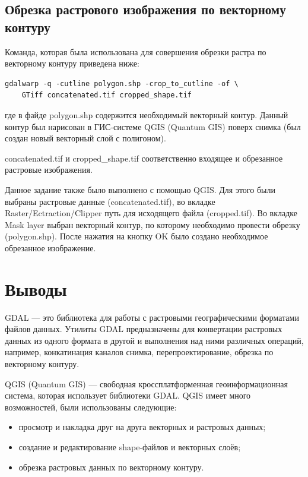 \section{Обрезка растрового изображения по векторному контуру}

Команда, которая была использована для совершения обрезки растра по векторному контуру приведена ниже:

\lstset{language=bash}
\begin{lstlisting}
gdalwarp -q -cutline polygon.shp -crop_to_cutline -of \
	GTiff concatenated.tif cropped_shape.tif
\end{lstlisting}

где в файде polygon.shp содержится необходимый векторный контур. Данный контур был нарисован в ГИС-системе QGIS (Quantum GIS) поверх снимка (был создан новый векторный слой с полигоном). 

concatenated.tif и cropped\_shape.tif соответственно входящее и обрезанное растровые изображения.

Данное задание также было выполнено с помощью QGIS. Для этого были выбраны растровые данные (concatenated.tif), во вкладке Raster/Ectraction/Clipper путь для исходящего файла (cropped.tif). Во вкладке Mask layer выбран векторный контур, по которому необходимо провести обрезку (polygon.shp). После нажатия на кнопку OK было создано необходимое обрезанное изображение.

\chapter*{Выводы}

GDAL --- это библиотека для работы с растровыми географическими форматами файлов данных. Утилиты GDAL предназначены для конвертации растровых данных из одного формата в другой и выполнения над ними различных операций, например, конкатинация каналов снимка, перепроектирование, обрезка по векторному контуру.

QGIS (Quantum GIS) --- свободная кроссплатформенная геоинформационная система, которая использует библиотеки GDAL. QGIS имеет много возможностей, были использованы следующие:
\begin{itemize}
\item просмотр и накладка друг на друга векторных и растровых данных;
\item создание и редактирование shape-файлов и векторных слоёв;
\item обрезка растровых данных по векторному контуру.
\end{itemize}

\clearpage
{}
{}
\renewcommand\bibname{Список литературы}



